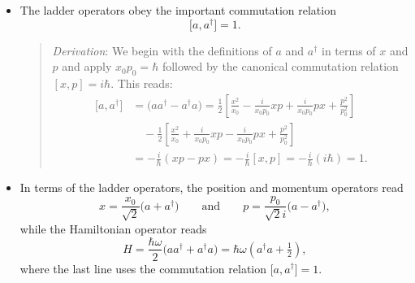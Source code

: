 \documentclass[11pt, a4paper]{article}
\begin{document}
\begin{itemize}
    \item The ladder operators obey the important commutation relation
	\begin{equation*}
		\big[a, a^{\dagger}\big] = 1.
	\end{equation*}
    \begin{quote}
        \textit{Derivation}: We begin with the definitions of $ a $ and $ a^{\dagger} $ in terms of $ x $ and $ p $ and apply $ x_{0}p_{0} = \hbar $ followed by the canonical commutation relation $ [x, p] = i \hbar $. This reads:
        \begin{align*}
            \big[ a, a^{\dagger} \big] &= \big( a a^{\dagger} - a^{\dagger}a \big) = \frac{1}{2}\left[ \frac{x^{2}}{x_{0}} - \frac{i}{x_{0}p_{0}} xp + \frac{i}{x_{0}p_{0}} px + \frac{p^{2}}{p_{0}^{2}}  \right]\\
            &{}\quad - \frac{1}{2}\left[ \frac{x^{2}}{x_{0}} + \frac{i}{x_{0}p_{0}} xp - \frac{i}{x_{0}p_{0}} px + \frac{p^{2}}{p_{0}^{2}}  \right]\\
            & = - \frac{i}{\hbar} (xp - px) = -\frac{i}{\hbar} [x, p] = - \frac{i}{\hbar}(i \hbar) = 1.
        \end{align*}
    \end{quote}

    \item In terms of the ladder operators, the position and momentum operators read 
    \begin{equation*}
        x = \frac{x_{0}}{\sqrt{2}} \big( a + a^{\dagger} \big) \qquad \text{and} \qquad  p = \frac{p_{0}}{\sqrt{2}i} \big( a - a^{\dagger} \big),
    \end{equation*}
    while the Hamiltonian operator reads
    \begin{equation*}
        H = \frac{\hbar \omega}{2} \big( aa^{\dagger} + a^{\dagger}a \big) = \hbar \omega \left( a^{\dagger}a + \tfrac{1}{2} \right),
    \end{equation*}
    where the last line uses the commutation relation $ \big[ a, a^{\dagger} \big] = 1 $.
    
\end{itemize}
\end{document}
